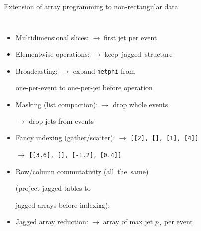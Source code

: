 \documentclass[aspectratio=169]{beamer}
\begin{document}
\begin{frame}{Extension of array programming to non-rectangular data}
\vspace{0.1 cm}
\begin{columns}
\begin{itemize}\setlength{\itemsep}{0.15 cm}
\item Multidimensional slices:  $\to$ first jet per event
\item Elementwise operations:  $\to$ \mbox{keep jagged structure\hspace{-1 cm}}
\item Broadcasting:  $\to$ expand {\small \texttt{metphi}} from

\tabto{5.5 cm}one-per-event to one-per-jet before operation

\item Masking (list compaction):  $\to$ drop whole events

 $\to$ drop jets from events

\item Fancy indexing (gather/scatter):  $\to$ \mbox{\small \texttt{[[2], [], [1], [4]]}\hspace{-0.5 cm}}

 $\to$ \mbox{\small \texttt{[[3.6], [], [-1.2], [0.4]]}\hspace{-0.5 cm}}

\item Row/column commutativity  \mbox{(all the same)\hspace{-0.5 cm}}

(project jagged tables to 

jagged arrays before indexing): 



\item Jagged array reduction:  $\to$ array of max jet $p_T$ per event
\end{itemize}
\end{columns}
\end{frame}
\end{document}

